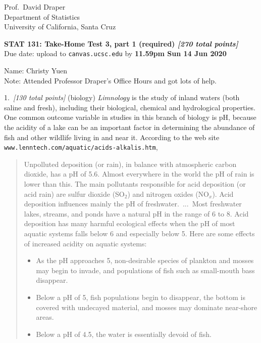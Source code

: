 \documentclass[12pt]{article}
\begin{document}
\begin{flushleft}

Prof.~David Draper \\
Department of Statistics \\
University of California, Santa Cruz

\end{flushleft}

\begin{center}

\textbf{\large STAT 131: Take-Home Test 3, part 1 (required) \textit{[270 total points]}} \\ Due date: upload to \texttt{canvas.ucsc.edu} by \textbf{11.59pm Sun 14 Jun 2020} 

\end{center}

\Large Name: Christy Yuen \\
\normalsize Note: Attended Professor Draper's Office Hours and got lots of help. 

1.~\textit{[130 total points]} (biology) \textit{Limnology} is the study of inland waters (both saline and fresh), including their biological, chemical and hydrological properties. One common outcome variable in studies in this branch of biology is pH, because the acidity of a lake can be an important factor in
determining the abundance of fish and other wildlife living in and near
it. According to the web site
\texttt{www.lenntech.com/aquatic/acids-alkalis.htm}, 

\begin{quote}

Unpolluted deposition (or rain), in balance with atmospheric carbon
dioxide, has a pH of 5.6. Almost everywhere in the world the pH of rain is
lower than this. The main pollutants responsible for acid deposition (or
acid rain) are sulfur dioxide (SO$_2$) and nitrogen oxides (NO$_x$). Acid
deposition influences mainly the pH of freshwater.~...~Most freshwater
lakes, streams, and ponds have a natural pH in the range of 6 to 8. Acid
deposition has many harmful ecological effects when the pH of most aquatic
systems falls below 6 and especially below 5. Here are some effects of
increased acidity on aquatic systems:

\begin{itemize}

\item

As the pH approaches 5, non-desirable species of plankton and mosses may
begin to invade, and populations of fish such as small-mouth bass
disappear.

\item

Below a pH of 5, fish populations begin to disappear, the bottom is
covered with undecayed material, and mosses may dominate near-shore areas.

\item

Below a pH of 4.5, the water is essentially devoid of fish.

\end{itemize}

\end{quote}
\end{document}
